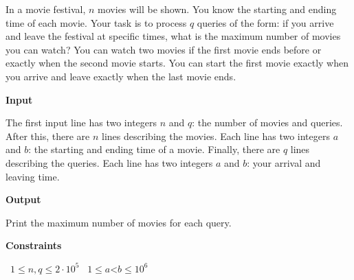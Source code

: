 In a movie festival, $n$ movies will be shown. You know the starting and ending time of each movie.
Your task is to process $q$ queries of the form: if you arrive and leave the festival at specific times, what is the maximum number of movies you can watch?
You can watch two movies if the first movie ends before or exactly when the second movie starts. You can start the first movie exactly when you arrive and leave exactly when the last movie ends.

\vspace{0.3cm}\noindent\textbf{Input}

The first input line has two integers $n$ and $q$: the number of movies and queries.
After this, there are $n$ lines describing the movies. Each line has two integers $a$ and $b$: the starting and ending time of a movie.
Finally, there are $q$ lines describing the queries. Each line has two integers $a$ and $b$: your arrival and leaving time.

\vspace{0.3cm}\noindent\textbf{Output}

Print the maximum number of movies for each query.

\vspace{0.3cm}\noindent\textbf{Constraints}

\textbullet\ $1 \le n,q \le 2 \cdot 10^5$
\textbullet\ $1 \le a $<$ b \le 10^6$